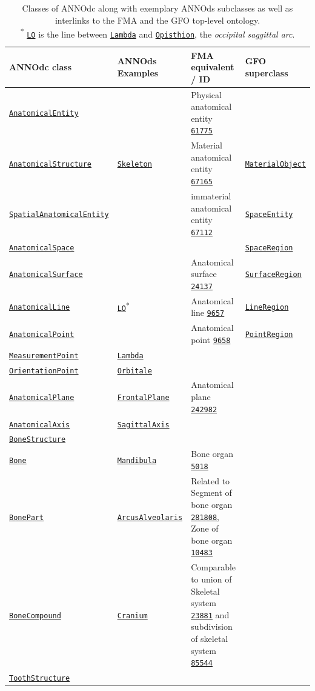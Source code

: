 \documentclass[sw]{iosart2x}
\newcommand{\anno}[1]{\href{https://annosaxfdm.de/ontology/#1}{\texttt{#1}}}
\newcommand{\gfo}[1]{\href{https://www.onto-med.de/ontologies/gfo/#1}{\texttt{#1}}}
\newcommand{\fma}[1]{\href{http://purl.org/sig/ont/fma/fma#1}{\texttt{#1}}}
\newcommand{\latin}[1]{\emph{#1}}
\begin{document}
\begin{table}[b]
  \centering
  \caption{Classes of ANNOdc along with exemplary ANNOds subclasses as well as interlinks to the FMA and the GFO top-level ontology.\\
  \textsuperscript{*} \anno{LO} is the line between \anno{Lambda} and \anno{Opisthion}, the \latin{occipital saggittal arc}.}
  \label{tab:core}
  \begin{tabulary}{\textwidth}{llLl}
    \toprule
	ANNOdc class					&ANNOds Examples				&FMA equivalent / ID						&GFO superclass	\\
	\midrule
	\anno{AnatomicalEntity}			&						&Physical anatomical entity \fma{61775}\\
	\anno{AnatomicalStructure}		&\anno{Skeleton}		&Material anatomical entity	\fma{67165}		&\gfo{MaterialObject}\\
	\anno{SpatialAnatomicalEntity}	&						&immaterial anatomical entity \fma{67112}	&\gfo{SpaceEntity}\\
	\anno{AnatomicalSpace}			&						&											&\gfo{SpaceRegion}\\
	\anno{AnatomicalSurface}		&						&Anatomical surface \fma{24137}			&\gfo{SurfaceRegion}\\
	\anno{AnatomicalLine}			&\anno{LO}\textsuperscript{*}	&Anatomical line \fma{9657}	&\gfo{LineRegion}\\
	\anno{AnatomicalPoint}			&						&Anatomical point \fma{9658}							&\gfo{PointRegion}\\
	\anno{MeasurementPoint}			&\anno{Lambda}\\%
	\anno{OrientationPoint}			&\anno{Orbitale}\\
	\anno{AnatomicalPlane}			&\anno{FrontalPlane}	&Anatomical plane \fma{242982}\\
	\anno{AnatomicalAxis}		 	&\anno{SagittalAxis}\\
	\anno{BoneStructure}\\
	\anno{Bone}						&\anno{Mandibula}				&Bone organ \fma{5018}\\
	\anno{BonePart}					&\anno{ArcusAlveolaris}	&Related to Segment of bone organ \fma{281808}, Zone of bone organ \fma{10483}\\
	\anno{BoneCompound}				&\anno{Cranium}				&Comparable to union of Skeletal system \fma{23881} and subdivision of skeletal system \fma{85544}\\
	\anno{ToothStructure}\\%

\end{tabulary}
\end{table}
\end{document}
